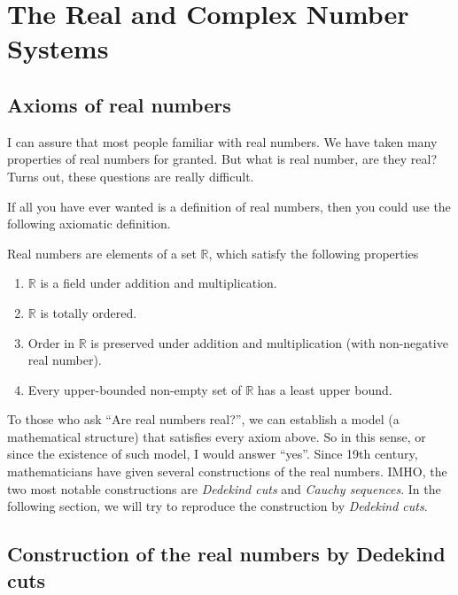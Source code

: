 \documentclass[class=mike-apostol-mathematical-analysis,crop=false]{standalone}
\begin{document}
\chapter{The Real and Complex Number Systems}

\section{Axioms of real numbers}

\par I can assure that most people familiar with real numbers. We have taken many properties of real numbers for granted. But what is real number, are they real? Turns out, these questions are really difficult.

\par If all you have ever wanted is a definition of real numbers, then you could use the following axiomatic definition.

\par Real numbers are elements of a set $\mathbb{R}$, which satisfy the following properties
\begin{enumerate}[label = (\roman*)]
    \item $\mathbb{R}$ is a field under addition and multiplication.
    \item $\mathbb{R}$ is totally ordered.
    \item Order in $\mathbb{R}$ is preserved under addition and multiplication (with non-negative real number).
    \item Every upper-bounded non-empty set of $\mathbb{R}$ has a least upper bound.
\end{enumerate}

\par To those who ask ``Are real numbers real?\@'', we can establish a model (a mathematical structure) that satisfies every axiom above. So in this sense, or since the existence of such model, I would answer ``yes''. Since 19th century, mathematicians have given several constructions of the real numbers. IMHO, the two most notable constructions are \textit{Dedekind cuts} and \textit{Cauchy sequences}. In the following section, we will try to reproduce the construction by \textit{Dedekind cuts}.

\section{Construction of the real numbers by Dedekind cuts}
\end{document}
